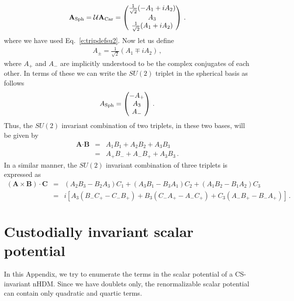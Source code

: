 \documentclass[11pt]{article}
\begin{document}
%
\begin{eqnarray}
\label{e:arel}
\bf{A}_{\rm{Sph}} = \mathcal{U} \bf{A}_{\rm{Car}} = \begin{pmatrix}
	\frac{1}{\sqrt{2}} (-A_1+iA_2) \\A_3\\\frac{1}{\sqrt{2}} (A_1 + iA_2)
	\end{pmatrix}\,.
\end{eqnarray}
%
where we have used Eq.~\eqref{e:tripdefsu2}.  
Now let us define 
%
\begin{eqnarray}
\label{e:apm}
A_{\pm}= \frac{1}{\sqrt{2}}(A_1\mp i A_2)\,,
\end{eqnarray}
%
where $A_+$ and $A_-$ are implicitly understood to be the complex conjugates of each other.
In terms of these we can write the $SU(2)$ triplet in the spherical basis as follows 
%
\begin{eqnarray}
\label{e:tripletdefsu2}
A_{\rm{Sph} }=\begin{pmatrix}
-A_+\\A_3\\A_-
\end{pmatrix}\,.
\end{eqnarray}
%
Thus, the $SU(2)$ invariant combination of two triplets, in these two bases, will be given by
%
\begin{subequations}
	\label{e:inv}
	\begin{eqnarray}
	\textbf{A}\cdot \textbf{B}&=& A_1B_1 + A_2B_2 +A_3B_3\\
	&=& A_+B_- + A_-B_+ + A_3B_3\,.
	\end{eqnarray}
\end{subequations}
%
In a similar manner, the $SU(2)$ invariant combination of three triplets is expressed as
%
\begin{subequations}
	\label{e:inv3}
	\begin{eqnarray}
	(\textbf{A}\times \textbf{B})\cdot \textbf{C} &=& (A_2B_3-B_2A_3)C_1+(A_3B_1-B_3A_1)C_2+(A_1B_2-B_1A_2)C_3 \\
	&=& i \left[A_3(B_-C_+ - C_-B_+) +B_3(C_-A_+ -A_-C_+) +C_3(A_-B_+ - B_-A_+)\right] \,.
	\end{eqnarray}
\end{subequations}

\section{Custodially invariant scalar potential}
\label{s:compare}
%
In this Appendix, we try to enumerate the terms in the scalar
potential of a CS-invariant nHDM.  Since we have doublets only, the
renormalizable scalar potential can contain only quadratic and quartic
terms.
\end{document}

